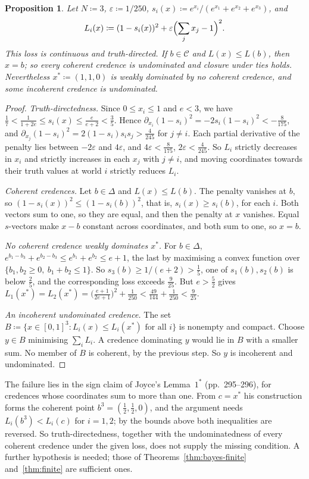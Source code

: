 \documentclass[11pt]{article}
\newtheorem{proposition}[theorem]{Proposition}
\theoremstyle{definition}
\theoremstyle{remark}
\newcommand{\C}{\mathcal C}
\begin{document}
\begin{proposition}\label{prop:joyce}
Let $N\coloneqq3$, $\varepsilon\coloneqq1/250$, $s_i(x)\coloneqq e^{x_i}/(e^{x_1}+e^{x_2}+e^{x_3})$, and
\[
L_i(x)\coloneqq(1-s_i(x))^2+\varepsilon\Bigl(\sum_jx_j-1\Bigr)^2.
\]
This loss is continuous and truth-directed. If $b\in\C$ and $L(x)\le L(b)$, then $x=b$; so every coherent credence is undominated and closure under ties holds. Nevertheless $x^*\coloneqq(1,1,0)$ is weakly dominated by no coherent credence, and some incoherent credence is undominated.
\end{proposition}
\begin{proof}
\emph{Truth-directedness.} Since $0\le x_i\le1$ and $e<3$, we have $\frac17<\frac1{1+2e}\le s_i(x)\le\frac e{e+2}<\frac35$. Hence $\partial_{x_i}(1-s_i)^2=-2s_i(1-s_i)^2<-\frac8{175}$, and $\partial_{x_j}(1-s_i)^2=2(1-s_i)s_is_j>\frac4{245}$ for $j\ne i$. Each partial derivative of the penalty lies between $-2\varepsilon$ and $4\varepsilon$, and $4\varepsilon<\frac8{175}$, $2\varepsilon<\frac4{245}$. So $L_i$ strictly decreases in $x_i$ and strictly increases in each $x_j$ with $j\ne i$, and moving coordinates towards their truth values at world $i$ strictly reduces $L_i$.

\emph{Coherent credences.} Let $b\in\Delta$ and $L(x)\le L(b)$. The penalty vanishes at $b$, so $(1-s_i(x))^2\le(1-s_i(b))^2$, that is, $s_i(x)\ge s_i(b)$, for each $i$. Both vectors sum to one, so they are equal, and then the penalty at $x$ vanishes. Equal $s$-vectors make $x-b$ constant across coordinates, and both sum to one, so $x=b$.

\emph{No coherent credence weakly dominates $x^*$.} For $b\in\Delta$, $e^{b_1-b_3}+e^{b_2-b_3}\le e^{b_1}+e^{b_2}\le e+1$, the last by maximising a convex function over $\{b_1,b_2\ge0,\ b_1+b_2\le1\}$. So $s_3(b)\ge1/(e+2)>\frac15$, one of $s_1(b),s_2(b)$ is below $\frac25$, and the corresponding loss exceeds $\frac9{25}$. But $e>\frac52$ gives $L_1(x^*)=L_2(x^*)=\bigl(\frac{e+1}{2e+1}\bigr)^2+\frac1{250}<\frac{49}{144}+\frac1{250}<\frac9{25}$.

\emph{An incoherent undominated credence.} The set $B\coloneqq\{x\in[0,1]^3:L_i(x)\le L_i(x^*)\text{ for all }i\}$ is nonempty and compact. Choose $y\in B$ minimising $\sum_iL_i$. A credence dominating $y$ would lie in $B$ with a smaller sum. No member of $B$ is coherent, by the previous step. So $y$ is incoherent and undominated.
\end{proof}

The failure lies in the sign claim of Joyce's Lemma~$1^*$ (pp.~295--296), for credences whose coordinates sum to more than one. From $c=x^*$ his construction forms the coherent point $b^3=(\frac12,\frac12,0)$, and the argument needs $L_i(b^3)<L_i(c)$ for $i=1,2$; by the bounds above both inequalities are reversed. So truth-directedness, together with the undominatedness of every coherent credence under the given loss, does not supply the missing condition. A further hypothesis is needed; those of Theorems~\ref{thm:bayes-finite} and~\ref{thm:finite} are sufficient ones.
\end{document}

